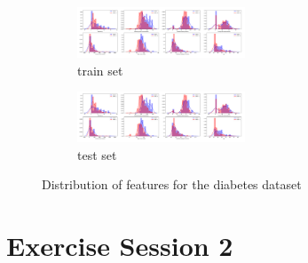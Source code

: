 \documentclass{article}
\newcommand{\ra}[1]{\renewcommand{\arraystretch}{#1}}
\begin{document}
%
%
%
%
%
%      
%                   
%
%
%
\begin{figure}[]
\
        \begin{subfigure}{1\linewidth}
            \includegraphics[width=5cm]{diab_train}
            \caption{train set}
        \end{subfigure}
        \begin{subfigure}{1\linewidth}
            \includegraphics[width=5cm]{diab_test}
            \caption{test set}
        \end{subfigure}
        \centering
	
     
             
\caption{Distribution of features for the diabetes dataset}        
        
             
        \label{fig:featuresdiab}
    \end{figure}


\clearpage
\section{Exercise Session 2}
\end{document}
